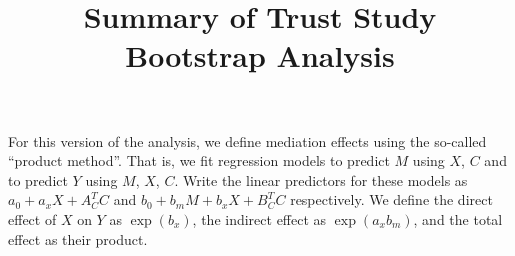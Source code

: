 \documentclass{article}
\title{Summary of Trust Study Bootstrap Analysis}
\begin{document}
\maketitle

For this version of the analysis, we define mediation effects using the so-called ``product method''. That is, we fit regression models to predict $M$ using $X$, $C$ and to predict $Y$ using $M$, $X$, $C$. Write the linear predictors for these models as $a_0 + a_x X + A_C^T C$ and $b_0 + b_m M + b_x X + B_C^T C$ respectively. We define the direct effect of $X$ on $Y$ as $\exp(b_x)$, the indirect effect as $\exp(a_x b_m)$, and the total effect as their product. 
\end{document}
